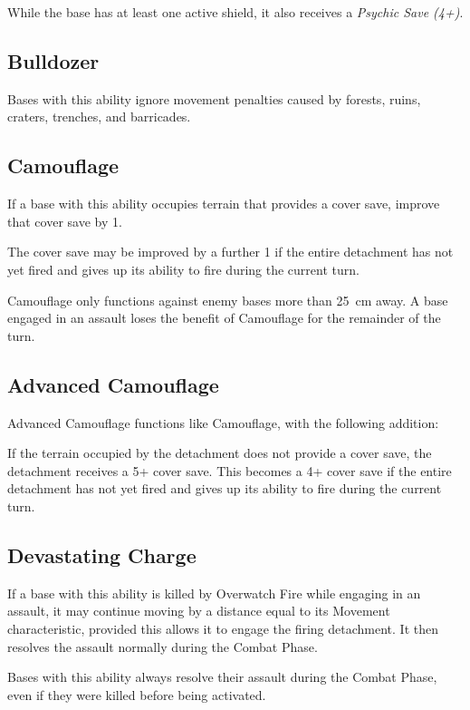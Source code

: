 While the base has at least one active shield, it also receives a \textit{Psychic Save (4+)}.

\subsection{Bulldozer}

Bases with this ability ignore movement penalties caused by forests, ruins, craters, trenches, and barricades.

\subsection{Camouflage}

If a base with this ability occupies terrain that provides a cover save, improve that cover save by 1.

The cover save may be improved by a further 1 if the entire detachment has not yet fired and gives up its ability to fire during the current turn.

Camouflage only functions against enemy bases more than 25~cm away. A base engaged in an assault loses the benefit of Camouflage for the remainder of the turn.

\subsection{Advanced Camouflage}

Advanced Camouflage functions like Camouflage, with the following addition:

If the terrain occupied by the detachment does not provide a cover save, the detachment receives a 5+ cover save. This becomes a 4+ cover save if the entire detachment has not yet fired and gives up its ability to fire during the current turn.

\subsection{Devastating Charge}

If a base with this ability is killed by Overwatch Fire while engaging in an assault, it may continue moving by a distance equal to its Movement characteristic, provided this allows it to engage the firing detachment. It then resolves the assault normally during the Combat Phase.

Bases with this ability always resolve their assault during the Combat Phase, even if they were killed before being activated.

